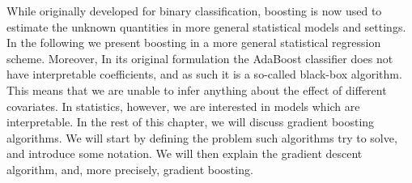 While originally developed for binary classification, boosting is now used to estimate the unknown quantities in more general statistical models and settings.
In the following we present boosting in a more general statistical regression scheme.
Moreover, In its original formulation the AdaBoost classifier does not have interpretable coefficients, and as such it is a so-called black-box algorithm.
This means that we are unable to infer anything about the effect of different covariates.
In statistics, however, we are interested in models which are interpretable.
In the rest of this chapter, we will discuss gradient boosting algorithms.
We will start by defining the problem such algorithms try to solve, and introduce some notation.
We will then explain the gradient descent algorithm, and, more precisely, gradient boosting.


